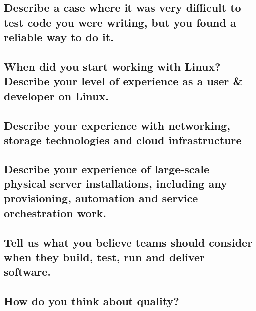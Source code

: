 \documentclass{article}
\begin{document}
\subsection{Describe a case where it was very difficult to test code you were writing, but you found a reliable way to do it.}
\subsection{When did you start working with Linux? Describe your level of experience as a user \& developer on Linux.}
\subsection{Describe your experience with networking, storage technologies and cloud infrastructure}
\subsection{Describe your experience of large-scale physical server installations, including any provisioning, automation and service orchestration work.}
\subsection{Tell us what you believe teams should consider when they build, test, run and deliver software.}
\subsection{How do you think about quality?}
\end{document}
